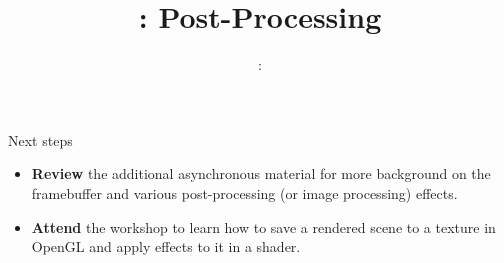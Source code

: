 \usepackage{../../beamerthemeFalmouthGamesAcademy}
\usepackage{multimedia}
\graphicspath{ {../../} }




\usepackage[normalem]{ulem}
\usepackage{wasysym}

\usepackage{pdfpages}

\usepackage{caption}
\captionsetup[figure]{font=scriptsize,labelfont=scriptsize}

\usetikzlibrary{arrows,automata}




\title{\sessionnumber: Post-Processing}
\subtitle{\modulecode: \moduletitle}

\frame{\titlepage} 







\begin{frame}{Next steps}
	\begin{itemize}
		\item \textbf{Review} the additional asynchronous material for more background on the framebuffer and various post-processing (or image processing) effects.
		\item \textbf{Attend} the workshop to learn how to save a rendered scene to a texture in OpenGL and apply effects to it in a shader.
	\end{itemize}
\end{frame}



